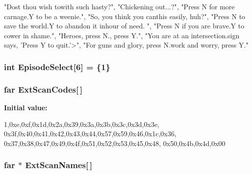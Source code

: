 \begin{DoxyCode}

{

        {"Dost thou wish to\nleave with such hasty\nabandon?"},
        {"Chickening out...\nalready?"},
        {"Press N for more carnage.\nPress Y to be a weenie."},
        {"So, you think you can\nquit this easily, huh?"},
        {"Press N to save the world.\nPress Y to abandon it in\nits hour of need.
      "},
        {"Press N if you are brave.\nPress Y to cower in shame."},
        {"Heroes, press N.\nWimps, press Y."},
        {"You are at an intersection.\nA sign says, 'Press Y to quit.'\n>"},
        {"For guns and glory, press N.\nFor work and worry, press Y."}











}
\end{DoxyCode}
\hypertarget{WL__MENU_8C_ac9a0802b2e58dc7ba8970f6ae09fc2bb}{
\subsubsection[{EpisodeSelect}]{\setlength{\rightskip}{0pt plus 5cm}int {\bf EpisodeSelect}\mbox{[}6\mbox{]} = \{1\}}}
\label{WL__MENU_8C_ac9a0802b2e58dc7ba8970f6ae09fc2bb}
\hypertarget{WL__MENU_8C_a54c559a79dbb86e12d4c934c6dc47d13}{
\subsubsection[{ExtScanCodes}]{ far {\bf ExtScanCodes}\mbox{[}$\,$\mbox{]}}}
\label{WL__MENU_8C_a54c559a79dbb86e12d4c934c6dc47d13}
{\bfseries Initial value:}
\begin{DoxyCode}
        
                                        {
        1,0xe,0xf,0x1d,0x2a,0x39,0x3a,0x3b,0x3c,0x3d,0x3e,
        0x3f,0x40,0x41,0x42,0x43,0x44,0x57,0x59,0x46,0x1c,0x36,
        0x37,0x38,0x47,0x49,0x4f,0x51,0x52,0x53,0x45,0x48,
        0x50,0x4b,0x4d,0x00
                                        }
\end{DoxyCode}
\hypertarget{WL__MENU_8C_a4f10ad453385a6043f005a6cfb27519f}{
\subsubsection[{ExtScanNames}]{ far $\ast$ {\bf ExtScanNames}\mbox{[}$\,$\mbox{]}}}
